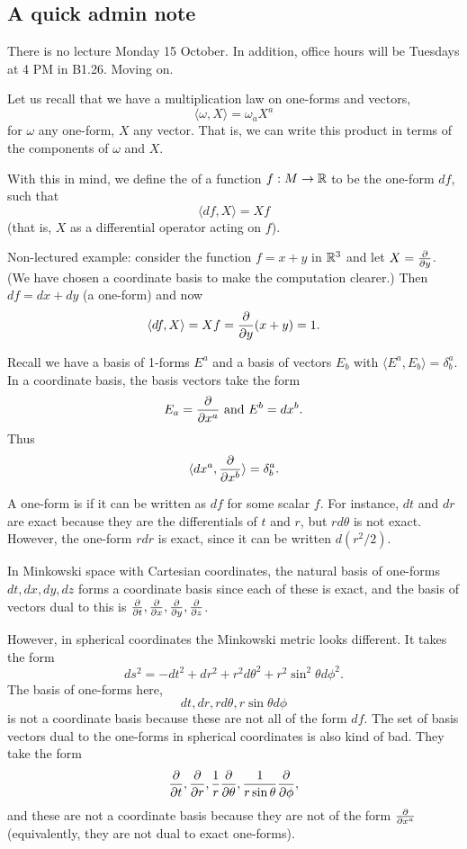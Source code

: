 \subsection*{A quick admin note} There is no lecture Monday 15 October. In addition, office hours will be Tuesdays at 4 PM in B1.26. Moving on.

Let us recall that we have a multiplication law on one-forms and vectors, 
$$\langle \omega, X\rangle = \omega_a X^a$$
for $\omega$ any one-form, $X$ any vector. That is, we can write this product in terms of the components of $\omega$ and $X$. 

\begin{defn}
With this in mind, we define the  of a function $f:M\to \RR$ to be the one-form $df$, such that
$$\langle df, X \rangle = Xf$$
(that is, $X$ as a differential operator acting on $f$).
\end{defn}
\begin{exm}
Non-lectured example: consider the function $f=x+y$ in $\RR^3$ and let $X= \P{}{y}$. (We have chosen a coordinate basis to make the computation clearer.) Then $df=dx+dy$ (a one-form) and now
$$\langle df, X \rangle = Xf = \P{}{y}(x+y)=1.$$
\end{exm}

Recall we have a basis of 1-forms $E^a$ and a basis of vectors $E_b$ with $\langle E^a, E_b \rangle = \delta^a_b$. In a coordinate basis, the basis vectors take the form
$$E_a = \P{}{x^a}\text{ and }E^b= dx^b.$$
Thus
$$\langle dx^a, \P{}{{x^b}}\rangle = \delta^a_b.$$
\begin{defn}
A one-form is  if it can be written as $df$ for some scalar $f$. For instance, $dt$ and $dr$ are exact because they are the differentials of $t$ and $r$, but $rd\theta$ is not exact. However, the one-form $r dr$ is exact, since it can be written $d(r^2 /2).$
\end{defn}
In Minkowski space with Cartesian coordinates, the natural basis of one-forms $dt,dx,dy,dz$ forms a coordinate basis since each of these is exact, and the basis of vectors dual to this is $\P{}{t},\P{}{x},\P{}{y},\P{}{z}$. 

However, in spherical coordinates the Minkowski metric looks different. It takes the form
$$ds^2=-dt^2 +dr^2+r^2d\theta^2 +r^2 \sin^2\theta d\phi^2.$$
The basis of one-forms here, 
$$dt, dr, rd\theta, r\sin\theta d\phi$$
is not a coordinate basis because these are not all of the form $df$.
The set of basis vectors dual to the one-forms in spherical coordinates is also kind of bad. They take the form 
$$\P{}{t},\P{}{r},\frac{1}{r}\P{}{\theta},\frac{1}{r\sin\theta}\P{}{\phi},$$ and these are not a coordinate basis because they are not of the form $\P{}{{x^a}}$ (equivalently, they are not dual to exact one-forms).

